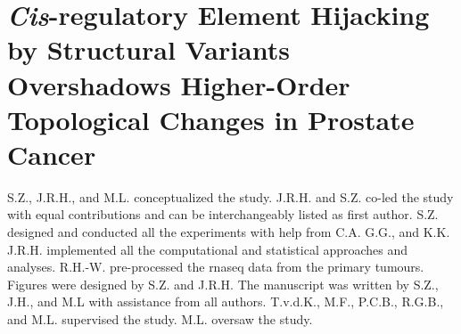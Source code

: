\chapter{\emph{Cis}-regulatory Element Hijacking by Structural Variants Overshadows Higher-Order Topological Changes in Prostate Cancer}

S.Z., J.R.H., and M.L. conceptualized the study.
J.R.H. and S.Z. co-led the study with equal contributions and can be interchangeably listed as first author.
S.Z. designed and conducted all the experiments with help from C.A. G.G., and K.K.
J.R.H. implemented all the computational and statistical approaches and analyses.
R.H.-W. pre-processed the \gls{rnaseq} data from the primary tumours.
Figures were designed by S.Z. and J.R.H.
The manuscript was written by S.Z., J.H., and M.L with assistance from all authors.
T.v.d.K., M.F., P.C.B., R.G.B., and M.L. supervised the study.
M.L. oversaw the study.






